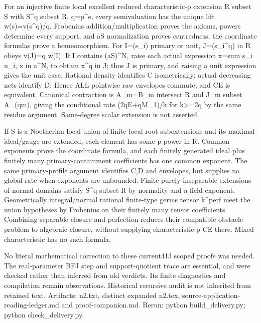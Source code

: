 \documentclass[11pt]{article}
\begin{document}
For an injective finite local excellent reduced characteristic-p extension R subset S with S\textasciicircum{}q subset R, q=p\textasciicircum{}e, every semivaluation has the unique lift w(s)=v(s\textasciicircum{}q)/q. Frobenius addition/multiplication proves the axioms, powers determine every support, and aS normalization proves centredness; the coordinate formulas prove a homeomorphism. For I=(s\_i) primary or unit, J=(s\_i\textasciicircum{}q) in R obeys v(J)=q w(I). If I contains (aS)\textasciicircum{}N, raise each actual expression x=sum s\_i u\_i, x in a\textasciicircum{}N, to obtain x\textasciicircum{}q in J; thus J is primary, and raising a unit expression gives the unit case. Rational density identifies C isometrically; actual decreasing nets identify D. Hence ALL pointwise raw envelopes commute, and CE is equivalent. Canonical contraction is A\_m=B\_m intersect R and J\_m subset A\_(qm), giving the conditional rate (2qE+qM\_1)/k for k>=2q by the same residue argument. Same-degree scalar extension is not asserted.

If S is a Noetherian local union of finite local root subextensions and its maximal ideal/gauge are extended, each element has some p-power in R. Common exponents prove the coordinate formula, and each finitely generated ideal plus finitely many primary-containment coefficients has one common exponent. The same primary-profile argument identifies C,D and envelopes, but supplies no global rate when exponents are unbounded. Finite purely inseparable extensions of normal domains satisfy S\textasciicircum{}q subset R by normality and a field exponent. Geometrically integral/normal rational finite-type germs tensor k\textasciicircum{}perf meet the union hypotheses by Frobenius on their finitely many tensor coefficients. Combining separable closure and perfection reduces their compatible obstacle problem to algebraic closure, without supplying characteristic-p CE there. Mixed characteristic has no such formula.

No literal mathematical correction to these current413 scoped proofs was needed. The real-parameter BFJ step and support-quotient trace are essential, and were checked rather than inferred from old verdicts. Its finite diagnostics and compilation remain observations. Historical recursive audit is not inherited from retained text. Artifacts: n2.txt, distinct expanded n2.tex, source-application-reading-ledger.md and proof-companion.md. Rerun: python build\_delivery.py; python check\_delivery.py.
\end{document}
